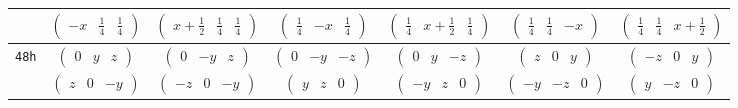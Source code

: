 \documentclass[fleqn,9pt,landscape]{jsarticle}
\begin{document}
\begin{center}
\begin{longtable}{ccccccc}
& $ \begin{pmatrix} - x & \frac{1}{4} & \frac{1}{4} \end{pmatrix} $ & $ \begin{pmatrix} x + \frac{1}{2} & \frac{1}{4} & \frac{1}{4} \end{pmatrix} $ & $ \begin{pmatrix} \frac{1}{4} & - x & \frac{1}{4} \end{pmatrix} $ & $ \begin{pmatrix} \frac{1}{4} & x + \frac{1}{2} & \frac{1}{4} \end{pmatrix} $ & $ \begin{pmatrix} \frac{1}{4} & \frac{1}{4} & - x \end{pmatrix} $ & $ \begin{pmatrix} \frac{1}{4} & \frac{1}{4} & x + \frac{1}{2} \end{pmatrix} $ \\ \hline
{\tt 48h} & $ \begin{pmatrix} 0 & y & z \end{pmatrix} $ & $ \begin{pmatrix} 0 & - y & z \end{pmatrix} $ & $ \begin{pmatrix} 0 & - y & - z \end{pmatrix} $ & $ \begin{pmatrix} 0 & y & - z \end{pmatrix} $ & $ \begin{pmatrix} z & 0 & y \end{pmatrix} $ & $ \begin{pmatrix} - z & 0 & y \end{pmatrix} $ \\
& $ \begin{pmatrix} z & 0 & - y \end{pmatrix} $ & $ \begin{pmatrix} - z & 0 & - y \end{pmatrix} $ & $ \begin{pmatrix} y & z & 0 \end{pmatrix} $ & $ \begin{pmatrix} - y & z & 0 \end{pmatrix} $ & $ \begin{pmatrix} - y & - z & 0 \end{pmatrix} $ & $ \begin{pmatrix} y & - z & 0 \end{pmatrix} $ \\ \hline

\end{longtable}
\end{center}
\end{document}
